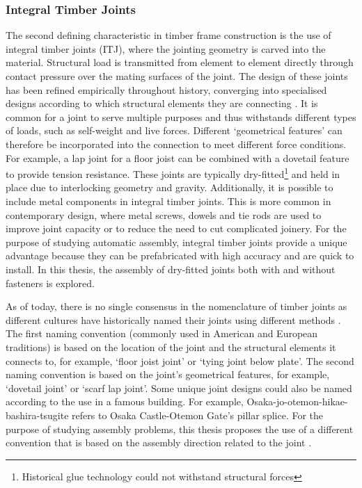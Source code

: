 \subsubsection{Integral Timber Joints}
\label{subsubsection:introduction-integral-timber-joints}

The second defining characteristic in timber frame construction is the use of integral timber joints (ITJ), where the jointing geometry is carved into the material. Structural load is transmitted from element to element directly through contact pressure over the mating surfaces of the joint. The design of these joints has been refined empirically throughout history, converging into specialised designs according to which structural elements they are connecting \autocite{jacksobonHistoricAmericanTimber2014}. It is common for a joint to serve multiple purposes and thus withstands different types of loads, such as self-weight and live forces. Different ‘geometrical features’ can therefore be incorporated into the connection to meet different force conditions. For example, a lap joint for a floor joist can be combined with a dovetail feature to provide tension resistance.
These joints are typically dry-fitted\footnote{Historical glue technology could not withstand structural forces} and held in place due to interlocking geometry and gravity.
Additionally, it is possible to include metal components in integral timber joints.
This is more common in contemporary design, where metal screws, dowels and tie rods are used to improve joint capacity or to reduce the need to cut complicated joinery.
For the purpose of studying automatic assembly, integral timber joints provide a unique advantage because they can be prefabricated with high accuracy  and are quick to install.
In this thesis, the assembly of dry-fitted joints both with and without fasteners is explored.

As of today, there is no single consensus in the nomenclature of timber joints as different cultures have historically named their joints using different methods \parencite{satoCompleteJapaneseJoinery1995,seikeArtJapaneseJoinery1977a,sumiyoshiWoodJointsClassical1991}. The first naming convention (commonly used in American and European traditions) is based on the location of the joint and the structural elements it connects to, for example, ‘floor joist joint’ or ‘tying joint below plate’. The second naming convention is based on the joint's geometrical features, for example, ‘dovetail joint’ or ‘scarf lap joint’. Some unique joint designs could also be named according to the use in a famous building. For example, Osaka-jo-otemon-hikae-bashira-tsugite refers to Osaka Castle-Otemon Gate's pillar splice. For the purpose of studying assembly problems, this thesis proposes the use of a different convention that is based on the assembly direction related to the joint .

